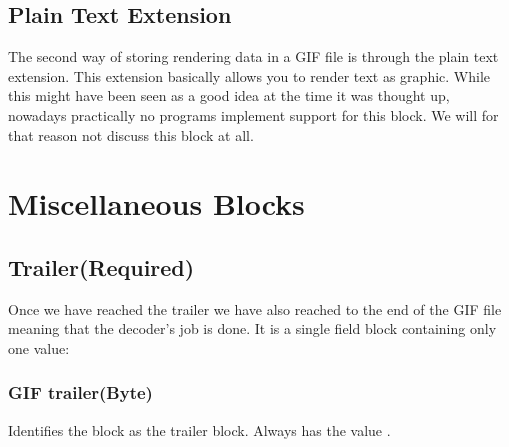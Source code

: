\begin{algorithm}[H]
\begin{algorithmic}[1]
    \State {}



    \State {}

    \EndIf
    \EndIf



    \EndWhile

  \end{algorithmic}
\end{algorithm}

\subsection{Plain Text Extension}

The second way of storing rendering data in a GIF file is through the
plain text extension. This extension basically allows you to render
text as graphic. While this might have been seen as a good idea at the
time it was thought up, nowadays practically no programs implement
support for this block. We will for that reason not discuss this
block at all.

\section{Miscellaneous Blocks}

\subsection{Trailer(Required)}

Once we have reached the trailer we have also reached to the end of
the GIF file meaning that the decoder's job is done. It is a single
field block containing only one value:

\subsubsection{GIF trailer(Byte)}

Identifies the block as the trailer block. Always has the value
.

